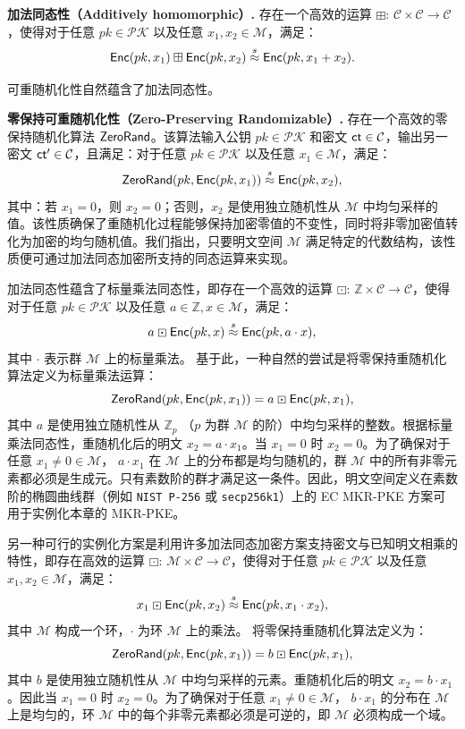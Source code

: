 \begin{trivlist}
\item \textbf{加法同态性（Additively homomorphic）.} 存在一个高效的运算 $\boxplus$: $\mathcal{C} \times \mathcal{C} \to \mathcal{C}$，使得对于任意 $pk \in \mathcal{PK}$ 以及任意 $x_1, x_2 \in \mathcal{M}$，满足：$$\mathsf{Enc}(pk,x_1) \boxplus \mathsf{Enc}(pk,x_2) \overset{s}{\approx} \mathsf{Enc}(pk,x_1 + x_2).$$

可重随机化性自然蕴含了加法同态性。

\item \textbf{零保持可重随机化性（Zero-Preserving Randomizable）.} 存在一个高效的零保持随机化算法 $\mathsf{ZeroRand}$。该算法输入公钥 $pk \in \mathcal{PK}$ 和密文 $\mathsf{ct} \in \mathcal{C}$，输出另一密文 $\mathsf{ct}' \in \mathcal{C}$，且满足：对于任意 $pk \in \mathcal{PK}$ 以及任意 $x_1 \in \mathcal{M}$，满足：$$\mathsf{ZeroRand}(pk,\mathsf{Enc}(pk,x_1)) \overset{s}{\approx} \mathsf{Enc}(pk,x_2),$$
其中：若 $x_1 = 0$，则 $x_2 = 0$；否则，$x_2$ 是使用独立随机性从 $\mathcal{M}$ 中均匀采样的值。该性质确保了重随机化过程能够保持加密零值的不变性，同时将非零加密值转化为加密的均匀随机值。我们指出，只要明文空间 $\mathcal{M}$ 满足特定的代数结构，该性质便可通过加法同态加密所支持的同态运算来实现。
\end{trivlist}

加法同态性蕴含了标量乘法同态性，即存在一个高效的运算 $\boxdot$: $\mathbb{Z} \times \mathcal{C} \to \mathcal{C}$，使得对于任意 $pk \in \mathcal{PK}$ 以及任意 $a \in \mathbb{Z}, x \in \mathcal{M}$，满足：$$a \boxdot \mathsf{Enc}(pk,x) \overset{s}{\approx} \mathsf{Enc}(pk,a \cdot x),$$ 
其中 $\cdot$ 表示群 $\mathcal{M}$ 上的标量乘法。
基于此，一种自然的尝试是将零保持重随机化算法定义为标量乘法运算：$$\mathsf{ZeroRand}(pk,\mathsf{Enc}(pk,x_1))  = a \boxdot \mathsf{Enc}(pk,x_1),$$
其中 $a$ 是使用独立随机性从 $\mathbb{Z}_p$ （$p$ 为群 $\mathcal{M}$ 的阶）中均匀采样的整数。根据标量乘法同态性，重随机化后的明文 $x_2 = a \cdot x_1$。当 $x_1 = 0$ 时 $x_2 = 0$。为了确保对于任意 $x_1 \ne 0 \in \mathcal{M}$， $a \cdot x_1$ 在 $\mathcal{M}$ 上的分布都是均匀随机的，群 $\mathcal{M}$ 中的所有非零元素都必须是生成元。只有素数阶的群才满足这一条件。因此，明文空间定义在素数阶的椭圆曲线群（例如 \texttt{NIST P-256} 或 \texttt{secp256k1}）上的 EC MKR-PKE 方案可用于实例化本章的 MKR-PKE。

另一种可行的实例化方案是利用许多加法同态加密方案支持密文与已知明文相乘的特性，即存在高效的运算 $\boxdot$: $\mathcal{M} \times \mathcal{C} \to \mathcal{C}$，使得对于任意 $pk \in \mathcal{PK}$ 以及任意 $x_1, x_2 \in \mathcal{M}$，满足：$$x_1 \boxdot \mathsf{Enc}(pk,x_2) \overset{s}{\approx} \mathsf{Enc}(pk,x_1 \cdot x_2),$$ 
其中 $\mathcal{M}$ 构成一个环，$\cdot$ 为环 $\mathcal{M}$ 上的乘法。
将零保持重随机化算法定义为：$$\mathsf{ZeroRand}(pk,\mathsf{Enc}(pk,x_1))  = b \boxdot \mathsf{Enc}(pk,x_1),$$ 
其中 $b$ 是使用独立随机性从 $\mathcal{M}$ 中均匀采样的元素。重随机化后的明文 $x_2 = b \cdot x_1$。因此当 $x_1 = 0$ 时 $x_2 = 0$。为了确保对于任意 $x_1 \ne 0 \in \mathcal{M}$， $b \cdot x_1$ 的分布在 $\mathcal{M}$ 上是均匀的，环 $\mathcal{M}$ 中的每个非零元素都必须是可逆的，即 $\mathcal{M}$ 必须构成一个域。

